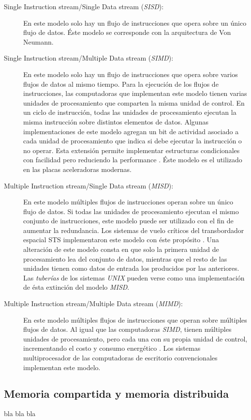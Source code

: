 \begin{description}

	\item[Single Instruction stream/Single Data stream (\emph{SISD}):] En
		este modelo solo hay un flujo de instrucciones que opera sobre
		un único flujo de datos. Éste modelo se corresponde con la
		arquitectura de Von Neumann.

	\item[Single Instruction stream/Multiple Data stream (\emph{SIMD}):] En
		este modelo solo hay un flujo de instrucciones que opera sobre
		varios flujos de datos al mismo tiempo. Para la ejecución de los
		flujos de instrucciones, las computadoras que implementan este
		modelo tienen varias unidades de procesamiento que comparten la
		misma unidad de control. En un ciclo de instrucción, todas las
		unidades de procesamiento ejecutan la misma instrucción sobre
		distintos elementos de datos. Algunas implementaciones de este
		modelo agregan un bit de actividad asociado a cada unidad de
		procesamiento que indica si debe ejecutar la instrucción o no
		operar. Esta extensión permite implementar estructuras
		condicionales con facilidad pero reduciendo la performance
		\cite{introToPC2002}. Éste modelo es el utilizado en las placas
		aceleradoras modernas.

	\item[Multiple Instruction stream/Single Data stream (\emph{MISD}):] En
		este modelo múltiples flujos de instrucciones operan sobre un
		único flujo de datos. Si todas las unidades de procesamiento
		ejecutan el mismo conjunto de instrucciones, este modelo puede
		ser utilizado con el fin de aumentar la redundancia. Los
		sistemas de vuelo críticos del transbordador espacial STS
		implementaron este modelo con éste propósito
		\cite{spaceShuttlePCS1984}. Una alteración de este modelo consta
		en que solo la primera unidad de procesamiento lea del conjunto
		de datos, mientras que el resto de las unidades tienen como
		datos de entrada los producidos por las anteriores. Las
		\emph{tuberías} de los sistemas \emph{UNIX} pueden verse como
		una implementación de ésta extinción del modelo \emph{MISD}.

	\item[Multiple Instruction stream/Multiple Data stream (\emph{MIMD}):] En
		este modelo múltiples flujos de instrucciones que operan sobre
		múltiples flujos de datos. Al igual que las computadoras
		\emph{SIMD}, tienen múltiples unidades de procesamiento, pero
		cada una con su propia unidad de control, incrementando el costo
		y consumo energético \cite{introToPC2002}. Los sistemas
		multiprocesador de las computadoras de escritorio convencionales
		implementan este modelo.

\end{description}

\subsection{Memoria compartida y memoria distribuida}

bla bla bla

